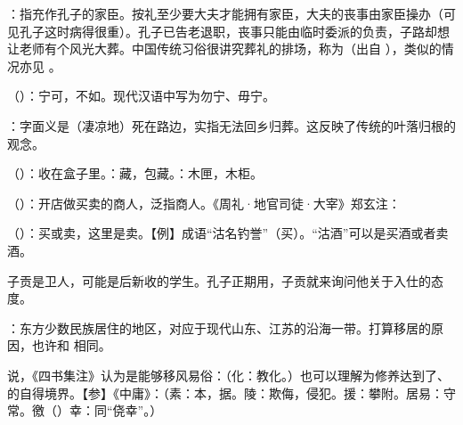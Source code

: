 {
\item {}：指充作孔子的家臣。按礼至少要大夫才能拥有家臣，大夫的丧事由家臣操办（可见孔子这时病得很重）。孔子已告老退职，丧事只能由临时委派的负责，子路却想让老师有个风光大葬。中国传统习俗很讲究葬礼的排场，称为（出自 ），类似的情况亦见  。
\item {}（）：宁可，不如。现代汉语中写为勿宁、毋宁。

\item {}：字面义是（凄凉地）死在路边，实指无法回乡归葬。这反映了传统的叶落归根的观念。
}
{}


{
\begin{lyitemize}
\item {}（）：收在盒子里。：藏，包藏。：木匣，木柜。
\item {}（）：开店做买卖的商人，泛指商人。《周礼·地官司徒·大宰》郑玄注：
\item {}（）：买或卖，这里是卖。【例】成语“沽名钓誉”（买）。“沽酒”可以是买酒或者卖酒。
\end{lyitemize}
子贡是卫人，可能是后新收的学生。孔子正期用，子贡就来询问他关于入仕的态度。
}
{}


{
\item {}：东方少数民族居住的地区，对应于现代山东、江苏的沿海一带。打算移居的原因，也许和  相同。
\item {}说，《四书集注》认为是能够移风易俗：（化：教化。）也可以理解为修养达到了、的自得境界。【参】《中庸》：（素：本，据。陵：欺侮，侵犯。援：攀附。居易：守常。徼（）幸：同“侥幸”。）
}
{}


